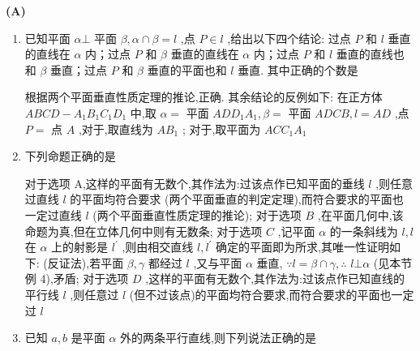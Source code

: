 \begin{center}  \textbf{(A)} \end{center}
\begin{enumerate}
    \item 已知平面 $\alpha  \bot$ 平面 $\beta ,\alpha  \cap  \beta  = l$ ,点 $P \in  l$ ,给出以下四个结论: 过点 $P$ 和 $l$ 垂直的直线在 $\alpha$ 内；过点 $P$ 和 $\beta$ 垂直的直线在 $\alpha$ 内；过点 $P$ 和 $l$ 垂直的直线也和 $\beta$ 垂直；过点 $P$ 和 $\beta$ 垂直的平面也和 $l$ 垂直. 其中正确的个数是 
    \begin{jieda}
        根据两个平面垂直性质定理的推论,正确. 其余结论的反例如下: 在正方体 ${ABCD} - {A}_{1}{B}_{1}{C}_{1}{D}_{1}$ 中,取 $\alpha  =$ 平面 ${AD}{D}_{1}{A}_{1},\beta  =$ 平面 ${ADCB},l = {AD}$ ,点 $P =$ 点 $A$ ,对于,取直线为 $A{B}_{1}$ ; 对于,取平面为 ${AC}{C}_{1}{A}_{1}$
    \end{jieda}
    \item 下列命题正确的是
    \begin{jieda}
        对于选项 A,这样的平面有无数个,其作法为:过该点作已知平面的垂线 $l$ ,则任意过直线 $l$ 的平面均符合要求 (两个平面垂直的判定定理),而符合要求的平面也一定过直线 $l$ (两个平面垂直性质定理的推论); 对于选项 $B$ ,在平面几何中,该命题为真,但在立体几何中则有无数条; 对于选项 $C$ ,记平面 $\alpha$ 的一条斜线为 $l,l$ 在 $\alpha$ 上的射影是 ${l}^{\prime }$ ,则由相交直线 $l,{l}^{\prime }$ 确定的平面即为所求,其唯一性证明如下: (反证法),若平面 $\beta ,\gamma$ 都经过 $l$ ,又与平面 $\alpha$ 垂直, $\because l = \beta  \cap  \gamma ,\therefore$  $l\bot \alpha$ (见本节例 4),矛盾; 对于选项 $D$ ,这样的平面有无数个,其作法为:过该点作已知直线的平行线 $l$ ,则任意过 $l$ (但不过该点)的平面均符合要求,而符合要求的平面也一定过 $l$
    \end{jieda}
    \item 已知 $a,b$ 是平面 $\alpha$ 外的两条平行直线,则下列说法正确的是
    \begin{jieda}

\end{jieda}
\end{enumerate}
